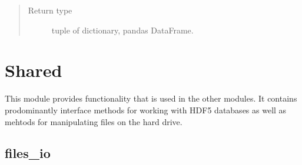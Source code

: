 \documentclass[letterpaper,10pt,english]{sphinxmanual}
\begin{document}
\begin{fulllineitems}
\begin{fulllineitems}
\begin{quote}
\begin{description}
\item[{Return type}] \leavevmode
tuple of dictionary, pandas DataFrame.

\end{description}\end{quote}

\end{fulllineitems}


\end{fulllineitems}



\section{Shared}
\label{\detokenize{shared:shared}}\label{\detokenize{shared::doc}}\label{\detokenize{shared:id1}}
This module provides functionality that is used in the other modules. It contains prodominantly interface methods for working with HDF5 databases as well as mehtods for manipulating files on the hard drive.


\subsection{files\_io}
\label{\detokenize{shared:files-io-label}}\label{\detokenize{shared:module-mleap.shared.files_io}}\label{\detokenize{shared:files-io}}
\end{document}
